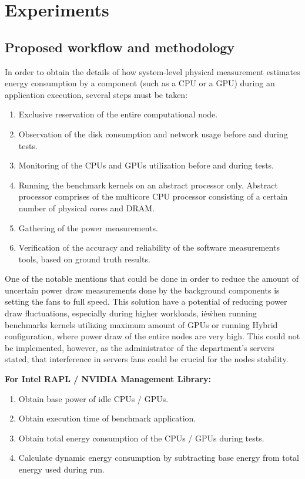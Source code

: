 \chapter{Experiments}

\section{Proposed workflow and methodology}

In order to obtain the details of how system-level physical measurement
estimates energy consumption by a component (such as a CPU or a GPU)
during an application execution, several steps must be taken:

\begin{enumerate}
    \item Exclusive reservation of the entire computational node.
    \item Observation of the disk consumption and network usage before and
    during tests.
    \item Monitoring of the CPUs and GPUs utilization before and during tests.
    \item Running the benchmark kernels on an abstract processor only.
    Abstract processor comprises of the multicore CPU processor consisting
    of a certain number of physical cores and DRAM\@.
    \item Gathering of the power measurements.
    \item Verification of the accuracy and reliability of the software
    measurements tools, based on ground truth results.
\end{enumerate}

One of the notable mentions that could be done in order to reduce the amount
of uncertain power draw measurements done by the background components is
setting the fans to full speed. This solution have a potential of reducing
power draw fluctuations, especially during higher workloads, i\. e\. when
running benchmarks kernels utilizing maximum amount of GPUs or running Hybrid
configuration, where power draw of the entire nodes are very high. This could
not be implemented, however, as the administrator of the department's servers
stated, that interference in servers fans could be crucial for the nodes
stability.

\textbf{For Intel RAPL / NVIDIA Management Library:}
\begin{enumerate}
    \item Obtain base power of idle CPUs / GPUs.
    \item Obtain execution time of benchmark application.
    \item Obtain total energy consumption of the CPUs / GPUs during tests.
    \item Calculate dynamic energy consumption by subtracting base energy from
    total energy used during run.
\end{enumerate}

